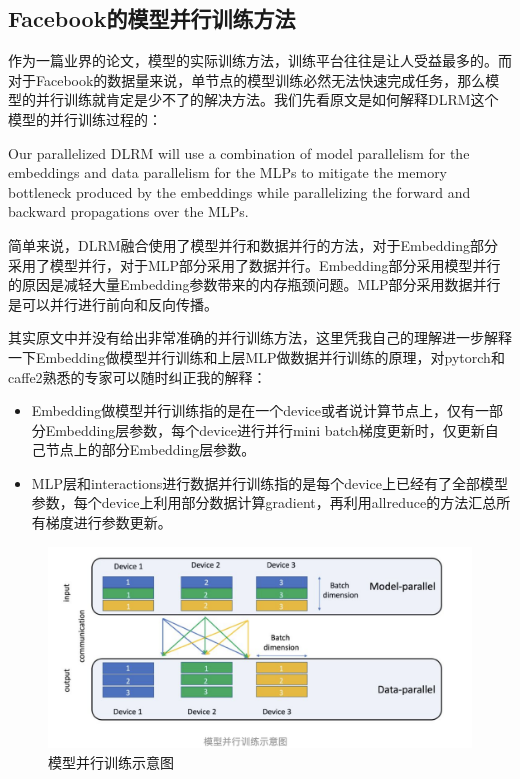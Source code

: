 \documentclass[12pt]{article}
\begin{document}
\subsection{Facebook的模型并行训练方法}
作为一篇业界的论文，模型的实际训练方法，训练平台往往是让人受益最多的。而对于Facebook的数据量来说，单节点的模型训练必然无法快速完成任务，那么模型的并行训练就肯定是少不了的解决方法。我们先看原文是如何解释DLRM这个模型的并行训练过程的：

Our parallelized DLRM will use a combination of model parallelism for the embeddings and data parallelism for the MLPs to mitigate the memory bottleneck produced by the embeddings while parallelizing the forward and backward propagations over the MLPs.

简单来说，DLRM融合使用了模型并行和数据并行的方法，对于Embedding部分采用了模型并行，对于MLP部分采用了数据并行。Embedding部分采用模型并行的原因是减轻大量Embedding参数带来的内存瓶颈问题。MLP部分采用数据并行是可以并行进行前向和反向传播。

其实原文中并没有给出非常准确的并行训练方法，这里凭我自己的理解进一步解释一下Embedding做模型并行训练和上层MLP做数据并行训练的原理，对pytorch和caffe2熟悉的专家可以随时纠正我的解释：
\begin{itemize}
\setlength{\itemsep}{0pt}
\setlength{\parsep}{0pt}
\setlength{\parskip}{0pt}
    \item Embedding做模型并行训练指的是在一个device或者说计算节点上，仅有一部分Embedding层参数，每个device进行并行mini batch梯度更新时，仅更新自己节点上的部分Embedding层参数。
    \item MLP层和interactions进行数据并行训练指的是每个device上已经有了全部模型参数，每个device上利用部分数据计算gradient，再利用allreduce的方法汇总所有梯度进行参数更新。
\end{itemize}

\begin{figure}[H]
    \centering
    \includegraphics[width=1\textwidth]{fig/Facebook_Parallel_Training.png}
    \caption{模型并行训练示意图}
\end{figure}
\end{document}
